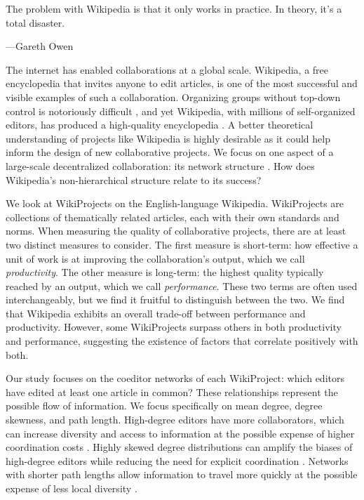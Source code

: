 \epigraph
{The problem with Wikipedia is that it only works in practice. In theory, it's a total disaster.}
{---Gareth Owen \cite{elsharbaty_editing_2016} }

The internet has enabled collaborations at a global scale.
Wikipedia, a free encyclopedia that invites anyone to edit articles,
is one of the most successful and visible examples of such a collaboration.
Organizing groups without top-down control is notoriously
difficult
\cite{freeman_tyranny_1972},
and yet Wikipedia, with millions of self-organized editors,
has produced a high-quality encyclopedia \cite{giles_internet_2005,keegan_evolution_2017}.
A better theoretical understanding of projects like Wikipedia is highly desirable as it could
help inform the design of new collaborative projects.
We focus on one aspect of a large-scale decentralized collaboration:
its network structure \cite{newman_structure_2003}.
How does Wikipedia's non-hierarchical structure relate to its success?

We look at WikiProjects on the English-language Wikipedia.
WikiProjects are collections of thematically related articles,
each with their own standards and norms.
When measuring the quality of collaborative projects,
there are at least two distinct measures to consider.
The first measure is short-term:
how effective a unit of work is at improving
the collaboration's output,
which we call {\em productivity}.
The other measure is long-term:
the highest quality typically reached by an output,
which we call {\em performance}.
These two terms are often used interchangeably,
but we find it fruitful to distinguish between the two.
We find that Wikipedia exhibits an overall trade-off between performance and productivity.
However, some WikiProjects surpass others in both productivity and performance,
suggesting the existence of factors that correlate positively with both.

Our study focuses on the coeditor networks of each WikiProject:
which editors have edited at least one article in common?
These relationships represent the possible flow of information.
We focus specifically on mean degree, degree skewness, and path length.
High-degree editors have more collaborators,
which can increase diversity and access to information at the possible
expense of higher coordination costs
\cite{hong_groups_2004,golub_naive_2010}.
Highly skewed degree distributions can amplify the biases of high-degree
editors while reducing the need for explicit coordination
\cite{kearns_experiments_2012}.
Networks with shorter path lengths allow information to travel more quickly
at the possible expense of less local diversity
\cite{mason_propagation_2008,barkoczi_social_2016}.

